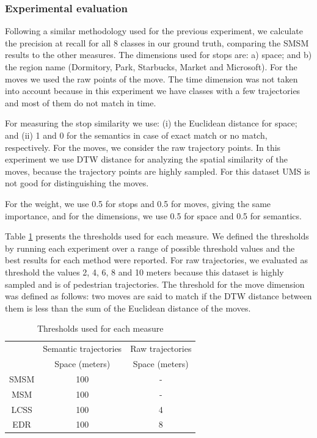 \documentclass[12pt]{article}
\begin{document}
\subsubsection{Experimental evaluation}

Following a similar methodology used for the previous experiment, we calculate the precision at recall for all 8 classes in our ground truth, comparing the SMSM results to the other measures. The dimensions used for stops are: a) space; and b) the region name (Dormitory, Park, Starbucks, Market and Microsoft). For the moves we used the raw points of the move. The time dimension was not taken into account because in this experiment we have classes with a few trajectories and most of them do not match in time.

For measuring the stop similarity we use: (i) the Euclidean distance for space; and (ii) 1 and 0 for the semantics in case of exact match or no match, respectively. For the moves,  we consider the raw trajectory points. In this experiment we use DTW distance for analyzing the spatial similarity of the moves, because the trajectory points are highly sampled. %
For this dataset UMS is not good for distinguishing the moves.

{For the weight, we use 0.5 for stops and 0.5 for moves, giving the same importance, and for the dimensions, we use 0.5 for space and 0.5 for semantics.}

Table \ref{tab:geolife_thresholds} presents the thresholds used for each measure. We defined the thresholds by running each experiment over a range of possible threshold values and the best results for each method were reported. For raw trajectories, we evaluated as threshold the  values 2, 4, 6, 8 and 10 meters because this dataset is highly sampled and is of pedestrian trajectories. The threshold for the move dimension was defined as follows: two moves are said to match if the DTW distance between them is less than the sum of the Euclidean distance of the moves.

\begin{table}[!h]
\scriptsize
  \centering
  \begin{tabular}{|c|c|c|}
  	\hline
  & \multicolumn{1}{c|}{Semantic trajectories} & \multicolumn{1}{c|}{Raw trajectories} \\
 	\cline{2-3}
  & Space (meters) & Space (meters) \\
  	\hline
 SMSM & 100 & - \\
 MSM & 100 & - \\
 LCSS & 100 & 4 \\
 EDR & 100 & 8 \\
    \hline
  \end{tabular}
  \caption{Thresholds used for each measure}
  \label{tab:geolife_thresholds}
\end{table}
\end{document}
